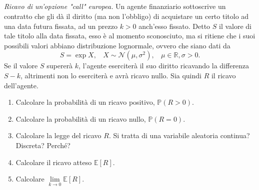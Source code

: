 \subsection{}

\textit{Ricavo di un'opzione "call" europea.} Un agente finanziario sottoscrive un contratto che gli dà il diritto (ma non l'obbligo) di acquistare un certo titolo ad una data futura fissata, ad un prezzo $k >0$ anch'esso fissato. Detto $S$ il valore di tale titolo alla data fissata, esso è al momento sconosciuto, ma si ritiene che i suoi possibili valori abbiano distribuzione lognormale, ovvero che siano dati da
\begin{equation*}
S=\exp X,\ \ \ \ X\sim \mathcal{N}\left( \mu ,\sigma ^{2}\right) ,\ \ \ \ \mu \in \mathbb{R} ,\sigma  >0.
\end{equation*}
Se il valore $S$ supererà $k$, l'agente eserciterà il suo diritto ricavando la differenza $S-k$, altrimenti non lo eserciterà e avrà ricavo nullo. Sia quindi $R$ il ricavo dell'agente.
\begin{enumerate}
\item Calcolare la probabilità di un ricavo positivo, $\mathbb{P}\left( R >0\right)$.
\item Calcolare la probabilità di un ricavo nullo, $\mathbb{P}\left( R=0\right)$.
\item Calcolare la legge del ricavo $R$. Si tratta di una variabile aleatoria continua? Discreta? Perché?
\item Calcolare il ricavo atteso $\mathbb{E}[ R]$.
\item Calcolare $\lim\limits _{k\rightarrow 0}\mathbb{E}[ R]$.
\end{enumerate}
\subsection{}

